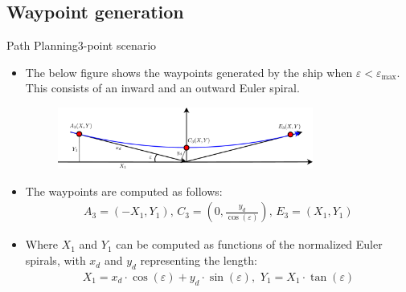 \documentclass[10pt]{beamer}
\begin{document}
\subsection{Waypoint generation}
\begin{frame}{Path Planning}{3-point scenario}
    \begin{itemize}
    \item The below figure shows the waypoints generated by the ship when $\varepsilon < \varepsilon_\text{max}$. This consists of an inward and an outward Euler spiral. 
    	\begin{figure}
			\begin{center}
				\includegraphics[width=8.4cm]{img/3Points} %
				\label{fig:3points}
			\end{center}
		\end{figure}
		\item The waypoints are computed as follows:
		\begin{align}
		A_3 = (-X_1,Y_1),\, C_3 = (0,\frac{y_d}{\cos(\varepsilon)}),\, E_3 = (X_1,Y_1)
		\end{align}
		\item Where $X_1$ and $Y_1$ can be computed as functions of the normalized Euler spirals, with $x_d$ and $y_d$ representing the length:
		\begin{align}
X_1 = x_d \cdot \cos(\varepsilon) + y_d \cdot \sin(\varepsilon),\,\, Y_1 = X_1 \cdot \tan(\varepsilon)
		\end{align}
    \end{itemize}
\end{frame}
\end{document}
